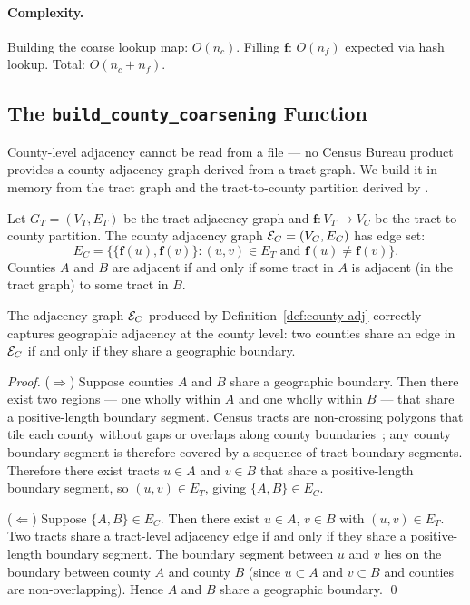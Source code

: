 \paragraph{Complexity.}
Building the coarse lookup map: $O(n_c)$.
Filling $\mathbf{f}$: $O(n_f)$ expected via hash lookup.
Total: $O(n_c + n_f)$.

\subsection{The \texttt{build\_county\_coarsening} Function}

County-level adjacency cannot be read from a file --- no Census Bureau
product provides a county adjacency graph derived from a tract graph.
We build it in memory from the tract graph and the tract-to-county
partition derived by \derive{}.

\begin{definition}
\label{def:county-adj}
Let $G_T = (V_T, E_T)$ be the tract adjacency graph and
$\mathbf{f}: V_T \to V_C$ be the tract-to-county partition.
The county adjacency graph $\mathcal{E}_C = (V_C, E_C)$ has edge set:
\[
  E_C = \bigl\{\{\mathbf{f}(u), \mathbf{f}(v)\} :
               (u, v) \in E_T \text{ and } \mathbf{f}(u) \neq \mathbf{f}(v)\bigr\}.
\]
Counties $A$ and $B$ are adjacent if and only if some tract in $A$
is adjacent (in the tract graph) to some tract in $B$.
\end{definition}

\begin{theorem}
\label{thm:county-adj}
The adjacency graph $\mathcal{E}_C$ produced by Definition~\ref{def:county-adj}
correctly captures geographic adjacency at the county level: two counties
share an edge in $\mathcal{E}_C$ if and only if they share a geographic boundary.
\end{theorem}

\begin{proof}
($\Rightarrow$) Suppose counties $A$ and $B$ share a geographic boundary.
Then there exist two regions --- one wholly within $A$ and one wholly
within $B$ --- that share a positive-length boundary segment.
Census tracts are non-crossing polygons that tile each county without
gaps or overlaps along county boundaries~\citep[TIGER/Line Technical
Documentation \S3.2]{tigertechnicaldoc2020}; any county boundary
segment is therefore covered by a sequence of tract boundary segments.
Therefore there exist tracts $u \in A$ and $v \in B$ that share a
positive-length boundary segment, so $(u, v) \in E_T$, giving
$\{A, B\} \in E_C$.

($\Leftarrow$) Suppose $\{A, B\} \in E_C$.
Then there exist $u \in A$, $v \in B$ with $(u,v) \in E_T$.
Two tracts share a tract-level adjacency edge if and only if they share
a positive-length boundary segment.
The boundary segment between $u$ and $v$ lies on the boundary between
county $A$ and county $B$ (since $u \subset A$ and $v \subset B$
and counties are non-overlapping).
Hence $A$ and $B$ share a geographic boundary. \qed
\end{proof}

